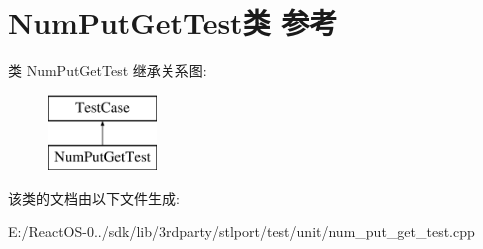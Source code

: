 \hypertarget{class_num_put_get_test}{}\section{Num\+Put\+Get\+Test类 参考}
\label{class_num_put_get_test}
类 Num\+Put\+Get\+Test 继承关系图\+:\begin{figure}[H]
\begin{center}
\leavevmode
\includegraphics[height=2.000000cm]{class_num_put_get_test}
\end{center}
\end{figure}


该类的文档由以下文件生成\+:\begin{DoxyCompactItemize}
\item 
E\+:/\+React\+O\+S-\/0../sdk/lib/3rdparty/stlport/test/unit/num\+\_\+put\+\_\+get\+\_\+test.\+cpp\end{DoxyCompactItemize}
